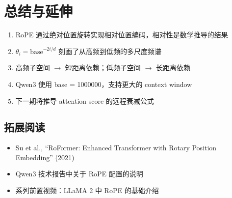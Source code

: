\section{总结与延伸}

\begin{enumerate}
  \item RoPE 通过绝对位置旋转实现相对位置编码，相对性是数学推导的结果
  \item $\theta_i = \text{base}^{-2i/d}$ 刻画了从高频到低频的多尺度频谱
  \item 高频子空间 $\to$ 短距离依赖；低频子空间 $\to$ 长距离依赖
  \item Qwen3 使用 base = 1000000，支持更大的 context window
  \item 下一期将推导 attention score 的远程衰减公式
\end{enumerate}

\subsection{拓展阅读}
\begin{itemize}
  \item Su et al., ``RoFormer: Enhanced Transformer with Rotary Position Embedding'' (2021)
  \item Qwen3 技术报告中关于 RoPE 配置的说明
  \item 系列前置视频：LLaMA 2 中 RoPE 的基础介绍
\end{itemize}


